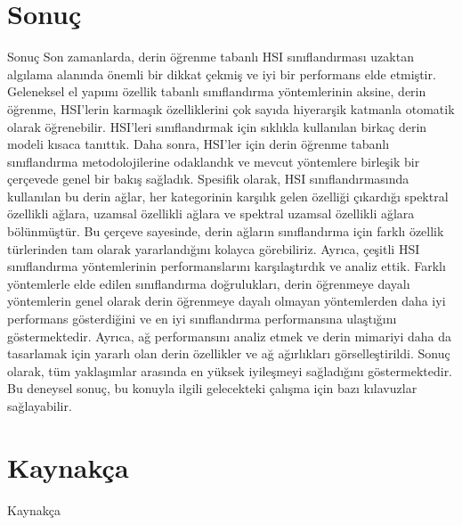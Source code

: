 \documentclass{beamer}
\begin{document}
\section{Sonuç}
\begin{frame}[allowframebreaks]{Sonuç}
  Son zamanlarda, derin öğrenme tabanlı HSI sınıflandırması uzaktan algılama alanında önemli bir dikkat çekmiş ve iyi bir performans elde etmiştir. Geleneksel el yapımı özellik tabanlı sınıflandırma yöntemlerinin aksine, derin öğrenme, HSI’lerin karmaşık özelliklerini çok sayıda hiyerarşik katmanla otomatik olarak öğrenebilir. HSI'leri sınıflandırmak için sıklıkla kullanılan birkaç derin modeli kısaca tanıttık. Daha sonra, HSI’ler için derin öğrenme tabanlı sınıflandırma metodolojilerine odaklandık ve mevcut yöntemlere birleşik bir çerçevede genel bir bakış sağladık. Spesifik olarak, HSI sınıflandırmasında kullanılan bu derin ağlar, her kategorinin karşılık gelen özelliği çıkardığı spektral özellikli ağlara, uzamsal özellikli ağlara ve spektral uzamsal özellikli ağlara bölünmüştür. Bu çerçeve sayesinde, derin ağların sınıflandırma için farklı özellik türlerinden tam olarak yararlandığını kolayca görebiliriz. Ayrıca, çeşitli HSI sınıflandırma yöntemlerinin performanslarını karşılaştırdık ve analiz ettik. Farklı yöntemlerle elde edilen sınıflandırma doğrulukları, derin öğrenmeye dayalı yöntemlerin genel olarak derin öğrenmeye dayalı olmayan yöntemlerden daha iyi performans gösterdiğini ve en iyi sınıflandırma performansına ulaştığını göstermektedir. Ayrıca, ağ performansını analiz etmek ve derin mimariyi daha da tasarlamak için yararlı olan derin özellikler ve ağ ağırlıkları görselleştirildi. Sonuç olarak, tüm yaklaşımlar arasında en yüksek iyileşmeyi sağladığını göstermektedir. Bu deneysel sonuç, bu konuyla ilgili gelecekteki çalışma için bazı kılavuzlar sağlayabilir. \cite{einstein}
\end{frame}

\section{Kaynakça}
\begin{frame}{Kaynakça}
    
    
    \scriptsize
\end{frame}
\end{document}
